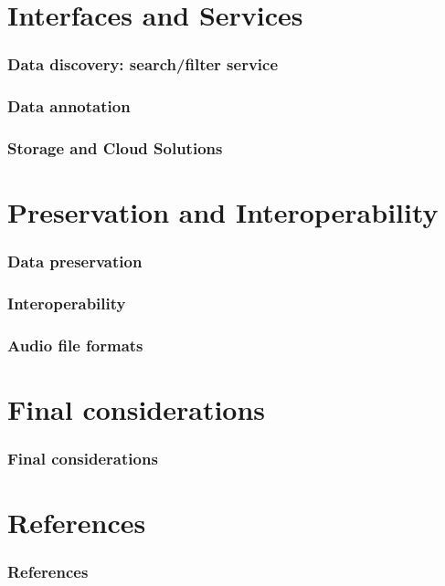 \documentclass{beamer}
\begin{document}
\section{Interfaces and Services}

  \begin{frame}
    \frametitle{Data discovery: search/filter service}
  \end{frame}



  \begin{frame}
    \frametitle{Data annotation}
  \end{frame}



  \begin{frame}
    \frametitle{Storage and Cloud Solutions}
  \end{frame}



\section{Preservation and Interoperability}

  \begin{frame}
    \frametitle{Data preservation}
  \end{frame}


  
  \begin{frame}
    \frametitle{Interoperability}
  \end{frame}

  

  \begin{frame}
    \frametitle{Audio file formats}
  \end{frame}

  

\section{Final considerations}

  \begin{frame}
    \frametitle{Final considerations}
  \end{frame}



\backupbegin

\section{References}

  \begin{frame}
    \frametitle{References}
  \end{frame}

\backupend
\end{document}
